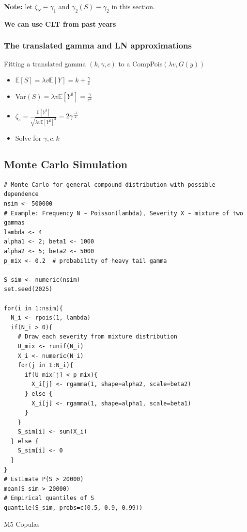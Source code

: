 \documentclass{article}
\begin{document}
\textbf{Note:} let \(\zeta_S \equiv \gamma_1\) and \(\gamma_2(S)\equiv\gamma_2\)
in this section.

\textbf{We can use CLT from past years}


\subsubsection{The translated gamma and LN approximations}
Fitting a translated gamma $(k,\gamma,c)$ to a CompPois$(\lambda v, G(y))$
\begin{itemize}
    \item $\mathbb{E}[S] = \lambda v \mathbb{E}[Y] = k + \frac{\gamma}{c}$
    \item Var$(S) = \lambda v \mathbb{E}[Y^2] = \frac{\gamma}{c^2}$ 
    \item $\zeta_s = \frac{\mathbb{E}[Y^3]}{\sqrt{\lambda v \mathbb{E}[Y^2]^{3}}} = 2\gamma^{\frac{-1}{2}}$
    \item Solve for $\gamma, c, k$
\end{itemize}

\subsection{Monte Carlo Simulation}
\begin{lstlisting}
# Monte Carlo for general compound distribution with possible dependence
nsim <- 500000
# Example: Frequency N ~ Poisson(lambda), Severity X ~ mixture of two gammas
lambda <- 4
alpha1 <- 2; beta1 <- 1000
alpha2 <- 5; beta2 <- 5000
p_mix <- 0.2  # probability of heavy tail gamma

S_sim <- numeric(nsim)
set.seed(2025)

for(i in 1:nsim){
  N_i <- rpois(1, lambda)
  if(N_i > 0){
    # Draw each severity from mixture distribution
    U_mix <- runif(N_i)
    X_i <- numeric(N_i)
    for(j in 1:N_i){
      if(U_mix[j] < p_mix){
        X_i[j] <- rgamma(1, shape=alpha2, scale=beta2)
      } else {
        X_i[j] <- rgamma(1, shape=alpha1, scale=beta1)
      }
    }
    S_sim[i] <- sum(X_i)
  } else {
    S_sim[i] <- 0
  }
}
# Estimate P(S > 20000)
mean(S_sim > 20000)
# Empirical quantiles of S
quantile(S_sim, probs=c(0.5, 0.9, 0.99))
\end{lstlisting}




\pagebreak


\begin{center}
    \Large{M5 Copulas}
\end{center}
    
\end{document}
